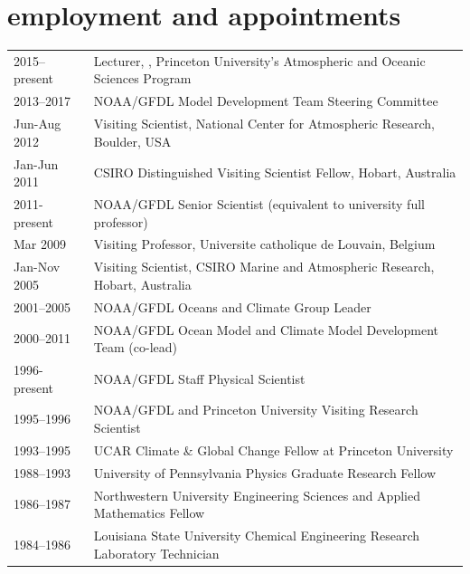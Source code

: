 \documentclass{article}
\begin{document}
\section*{\sc \color{Maroon}   employment and appointments} 
\vspace{-.25cm}
\begin{tabular}{ll}


2015--present & Lecturer, , Princeton University's Atmospheric and Oceanic Sciences Program
  \\
  2013--2017  & NOAA/GFDL Model Development Team Steering Committee  \\
  Jun-Aug 2012  & Visiting Scientist, National Center for Atmospheric
                  Research, Boulder, USA \\
  Jan-Jun 2011   & CSIRO Distinguished Visiting Scientist Fellow, Hobart, Australia \\
  2011-present & NOAA/GFDL Senior Scientist (equivalent to university full professor) \\ 
  Mar 2009         & Visiting Professor, Universite catholique de Louvain, Belgium \\
  Jan-Nov 2005   & Visiting Scientist, CSIRO Marine and Atmospheric  Research, Hobart, Australia \\
  2001--2005     & NOAA/GFDL Oceans and Climate Group Leader \\
  2000--2011     & NOAA/GFDL Ocean Model and Climate Model Development Team (co-lead) \\
  1996-present   &  NOAA/GFDL Staff Physical Scientist \\  
  1995--1996     &  NOAA/GFDL and Princeton University Visiting Research Scientist  \\ 
  1993--1995     & UCAR Climate \& Global Change Fellow at Princeton University \\
  1988--1993     &  University of Pennsylvania Physics Graduate Research Fellow  \\                     
  1986--1987     &  Northwestern University Engineering Sciences and Applied Mathematics Fellow \\
  1984--1986     &  Louisiana State University Chemical Engineering Research Laboratory Technician                     
\end{tabular}
\end{document}

